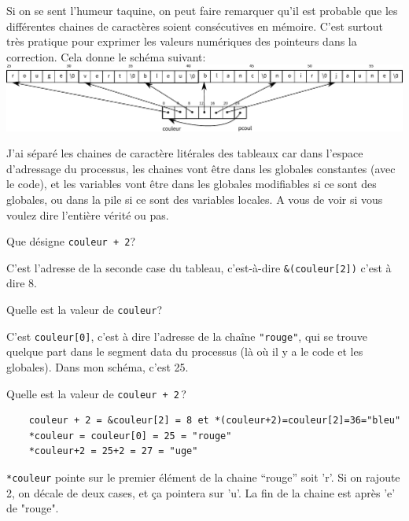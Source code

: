\documentclass[10pt]{article}\usepackage[nu,correction]{esial}
\begin{document}
\begin{Reponse}
  Si on se sent l'humeur taquine, on peut faire remarquer qu'il est
  probable que les différentes chaines de caractères soient
  consécutives en mémoire. C'est surtout très pratique pour exprimer
  les valeurs numériques des pointeurs dans la correction. 
  Cela donne le schéma suivant: \\

  \noindent
  \includegraphics[width=\linewidth]{memoire-couleur2.pdf}

  J'ai séparé les chaines de caractère litérales des tableaux car dans
  l'espace d'adressage du processus, les chaines vont être dans les
  globales constantes (avec le code), et les variables vont être dans
  les globales modifiables si ce sont des globales, ou dans la pile si
  ce sont des variables locales. A vous de voir si vous voulez dire
  l'entière vérité ou pas.
\end{Reponse}

\Question Que  désigne {\tt couleur + 2}?

\begin{Reponse}
  C'est l'adresse de la seconde case du tableau, c'est-à-dire
  \verb|&(couleur[2])| c'est à dire 8.
\end{Reponse}

\Question Quelle est la valeur de {\tt *couleur}?

\begin{Reponse}
  C'est \verb|couleur[0]|, c'est à dire l'adresse de la chaîne
  \texttt{"rouge"}, qui se trouve quelque part dans le segment data du
  processus (là où il y a le code et les globales). Dans mon schéma,
  c'est 25.
\end{Reponse}

\Question Quelle est la valeur de {\tt *couleur + 2}\,?

\begin{Reponse}
\begin{verbatim} 
    couleur + 2 = &couleur[2] = 8 et *(couleur+2)=couleur[2]=36="bleu"
    *couleur = couleur[0] = 25 = "rouge"
    *couleur+2 = 25+2 = 27 = "uge"
\end{verbatim}

\noindent\verb?*couleur? pointe sur le premier élément de la chaine ``rouge''
soit 'r'. Si on rajoute 2, on décale de deux cases, et ça pointera sur
'u'. La fin de la chaine est après 'e' de "rouge".
\end{Reponse}
\end{document}
